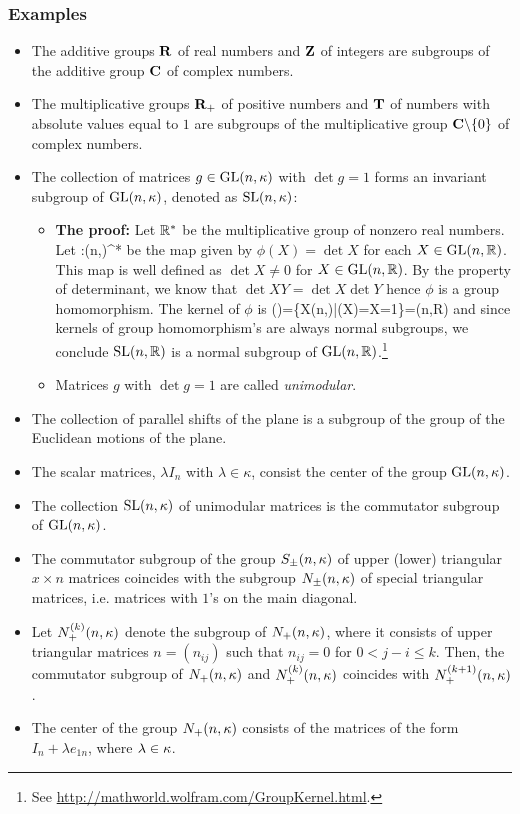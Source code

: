 \subsubsection{Examples}
\begin{itemize}
	\item The additive groups $\mathbf{R}$ of real numbers and $\mathbf{Z}$ of integers are subgroups of the additive group $\mathbf{C}$ of complex numbers.
	\item The multiplicative groups $\mathbf{R}_+$ of positive numbers and $\mathbf{T}$ of numbers with absolute values equal to $1$ are subgroups of the multiplicative group $\mathbf{C}\backslash\{0\}$ of complex numbers.
	\item The collection of matrices $g\in \mathrm{GL}(n,\kappa)$ with $\det g=1$ forms an invariant subgroup of $\mathrm{GL}(n,\kappa)$, denoted as $\mathrm{SL}(n,\kappa)$:
	\begin{itemize}
		\item \textbf{The proof:} Let $\mathbb{R}^*$ be the multiplicative group of nonzero real numbers. Let 
		\be 
		\phi:\GL(n,\R)\rightarrow\R^*
		\ee
		be the map given by $\phi(X)=\det X$ for each $X\in\mathrm{GL}(n,\mathbb{R})$. This map is well defined as $\det X\ne 0$ for $X\in\mathrm{GL}(n,\mathbb{R})$. By the property of determinant, we know that \mbox{$\det XY=\det X \det Y$} hence $\phi$ is a group homomorphism. The kernel of $\phi$ is 
		\be 
		\ker(\phi)=\{X\in\GL(n,\R)|\phi(X)=\det X=1\}=\SL(n,R)
		\ee 
		and since kernels of group homomorphism's are always normal subgroups, we conclude $\mathrm{SL}(n,\mathbb{R})$ is a normal subgroup of $\mathrm{GL}(n,\mathbb{R})$.\footnote{See \url{http://mathworld.wolfram.com/GroupKernel.html}.}
		\item Matrices $g$ with $\det g=1$ are called \emph{unimodular}.
	\end{itemize}
	\item The collection of parallel shifts of the plane is a subgroup of the group of the Euclidean motions of the plane.
	\item The scalar matrices, $\lambda I_n$ with $\lambda \in \kappa$, consist the center of the group $\mathrm{GL}(n,\kappa)$.
	\item The collection $\mathrm{SL}(n,\kappa)$ of unimodular matrices is the commutator subgroup of $\mathrm{GL}(n,\kappa)$.
	\item The commutator subgroup of the group $S_\pm(n,\kappa)$ of upper (lower) triangular $x\times n$ matrices coincides with the subgroup $N_\pm(n,\kappa)$ of special triangular matrices, i.e. matrices with $1$'s on the main diagonal. 
	\item Let $N_+^{(k)}(n,\kappa)$ denote the subgroup of $N_+(n,\kappa)$, where it consists of upper triangular matrices $n=(n_{ij})$ such that $n_{ij}=0$ for $0<j-i\le k$. Then, the commutator subgroup of $N_+(n,\kappa)$ and $N_+^{(k)}(n,\kappa)$ coincides with $N_+^{(k+1)}(n,\kappa)$.
	\item The center of the group $N_+(n,\kappa)$ consists of the matrices of the form $I_n+\lambda e_{1n}$, where $\lambda \in \kappa$.
\end{itemize}

